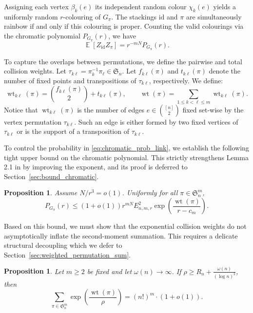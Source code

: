 \documentclass[10pt,a4paper]{amsart}
\newtheorem{proposition}[theorem]{Proposition}
\newcommand\E{\operatorname{\mathbb{E}}}
\renewcommand\leq{\leqslant}
\renewcommand\ge{\geqslant}
\renewcommand\to{\rightarrow}
\newcommand{\wt}{\operatorname{wt}}
\begin{document}
Assigning each vertex $\beta_k(e)$ its independent random colour $\chi_k(e)$ yields a uniformly random $r$-colouring of $G_\pi$. The stackings $\mathrm{id}$ and $\pi$ are simultaneously rainbow if and only if this colouring is proper. Counting the valid colourings via the chromatic polynomial $P_{G_\pi}(r)$, we have
\begin{equation}\label{eq:chromatic_prob_link}
\E[Z_{\mathrm{id}}Z_\pi] =r^{-mN}P_{G_\pi}(r).
\end{equation}

To capture the overlaps between permutations, we define the pairwise and total collision weights. Let $\tau_{k\ell}=\pi_k^{-1}\pi_\ell\in\mathfrak S_n$. Let $f_{k\ell}(\pi)$ and $t_{k\ell}(\pi)$ denote the number of fixed points and transpositions of $\tau_{k\ell}$, respectively. We define:
\begin{equation}\label{eq:weight_def}
        \wt_{k\ell}(\pi)=\binom{f_{k\ell}(\pi)}2+t_{k\ell}(\pi),
        \qquad
        \wt(\pi)=\sum_{1\leq k<\ell\leq m}\wt_{k\ell}(\pi).
\end{equation}
Notice that $\wt_{k\ell}(\pi)$ is the number of edges $e\in\binom{[n]}2$ fixed set-wise by the vertex permutation $\tau_{k\ell}$.  Such an edge is either formed by two fixed vertices of $\tau_{k\ell}$ or is the support of a transposition of $\tau_{k\ell}$.

To control the probability in \eqref{eq:chromatic_prob_link}, we establish the following tight upper bound on the chromatic polynomial. This strictly strengthens Lemma 2.1 in \cite{ADK}  by improving the exponent, and its proof is deferred to Section~\ref{sec:bound_chromatic}.

\begin{proposition}\label{prop:N_pi_final_bound}
Assume $N/r^3=o(1)$.  Uniformly for all $\pi\in\mathfrak S_n^m$,
\begin{equation}\label{eq:N_pi_formula}
        P_{G_\pi}(r) \leq (1+o(1))r^{mN}E_{n,m,r}^2 \exp\left(\frac{\wt(\pi)}{r-c_m}\right).
\end{equation}
\end{proposition}


Based on this bound, we must show that the exponential collision weights do not asymptotically inflate the second-moment summation. This requires a delicate structural decoupling which we defer to Section~\ref{sec:weighted_permutation_sum}.

\begin{proposition}\label{prop:weighted_permutation_sum}
Let $m\ge2$ be fixed and let $\omega(n)\to\infty$.  If $\rho\ge R_n+\frac{\omega(n)}{(\log n)^2}$, then
\begin{equation}\label{eq:target_sum}
       \sum_{\pi\in\mathfrak S_n^m}
        \exp\left(\frac{\wt(\pi)}\rho\right)
        =(n!)^m\cdot(1+o(1)).
\end{equation}
\end{proposition}
\end{document}
